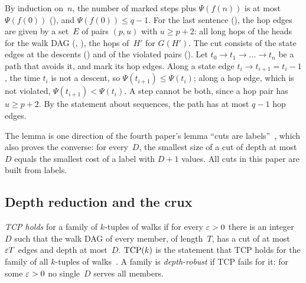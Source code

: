 \begin{outline}
By induction on~$n$, the number of marked steps plus $\Psi(f(n))$ is at most $\Psi(f(0))$
(), and $\Psi(f(0))\le q-1$. For the last sentence (), the hop edges are
given by a set~$E$ of pairs $(p,u)$ with $u\ge p+2$: all long hops of the heads for the walk DAG
(, ), the hops of~$H'$ for $G(H')$. The cut consists of the state edges at the
descents () and of the violated pairs (). Let $t_0\to t_1\to\dots\to t_n$ be a path
that avoids it, and mark its hop edges. Along a state edge $t_i\to t_{i+1}=t_i-1$, the time $t_i$ is not a descent, so
$\Psi(t_{i+1})\le\Psi(t_i)$; along a hop edge, which is not violated, $\Psi(t_{i+1})<\Psi(t_i)$. A step cannot be both,
since a hop pair has $u\ge p+2$. By the statement about sequences, the path has at most $q-1$ hop edges.
\end{outline}

The lemma is one direction of the fourth paper's lemma ``cuts are labels''~\cite[Lemma~5.2]{FourthPaper2026}, which also
proves the converse: for every~$D$, the smallest size of a cut of depth at most~$D$ equals the smallest cost of a label
with $D+1$ values. All cuts in this paper are built from labels.

\subsection{Depth reduction and the crux}\label{sec:prelim-tcp}

\begin{definition}\label{def:tcp}
\emph{TCP holds} for a family of $k$-tuples of walks if for every $\varepsilon>0$ there is an integer~$D$ such that the walk DAG
of every member, of length~$T$, has a cut of at most $\varepsilon T$ edges and depth at most~$D$. $\mathrm{TCP}(k)$ is the statement
that TCP holds for the family of all $k$-tuples of walks~\cite[Problem~5.1]{FourthPaper2026}. A family is
\emph{depth-robust} if TCP fails for it: for some $\varepsilon>0$ no single~$D$ serves all members.
\end{definition}

